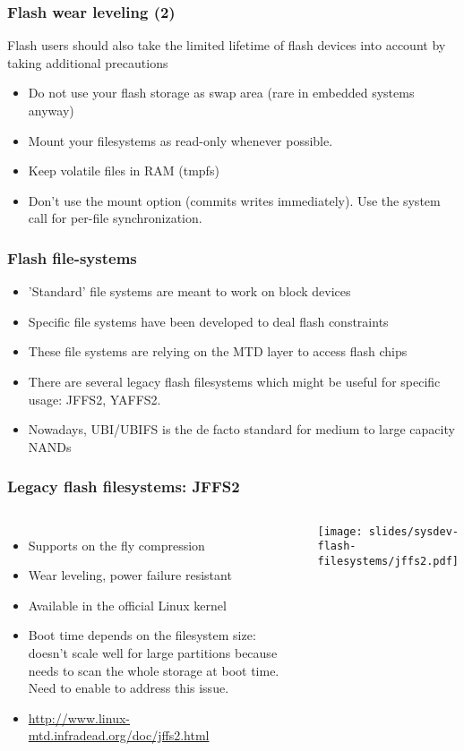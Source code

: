 \begin{frame}
  \frametitle{Flash wear leveling (2)}
  Flash users should also take the limited lifetime of flash
  devices into account by taking additional precautions
  \begin{itemize}
  \item Do not use your flash storage as swap area (rare in embedded
    systems anyway)
  \item Mount your filesystems as read-only whenever possible.
  \item Keep volatile files in RAM (tmpfs)
  \item Don't use the  mount option (commits writes
    immediately). Use the  system call for per-file
    synchronization.
  \end{itemize}
\end{frame}

\begin{frame}
  \frametitle{Flash file-systems}
  \begin{itemize}
  \item 'Standard' file systems are meant to work on block devices
  \item Specific file systems have been developed to deal flash
    constraints
  \item These file systems are relying on the MTD layer to access
    flash chips
  \item There are several legacy flash filesystems which might be
    useful for specific usage: JFFS2, YAFFS2.
  \item Nowadays, UBI/UBIFS is the de facto standard for medium to
    large capacity NANDs
  \end{itemize}
\end{frame}

\begin{frame}
  \frametitle{Legacy flash filesystems: JFFS2}
  \begin{columns}
    \begin{itemize}
    \item Supports on the fly compression
    \item Wear leveling, power failure resistant
    \item Available in the official Linux kernel
    \item Boot time depends on the filesystem size: doesn't scale well
      for large partitions because needs to scan the whole storage at
      boot time. Need to enable  to
      address this issue.
    \item \url{http://www.linux-mtd.infradead.org/doc/jffs2.html}
    \end{itemize}
    \texttt{[image: slides/sysdev-flash-filesystems/jffs2.pdf]}
  \end{columns}
\end{frame}

